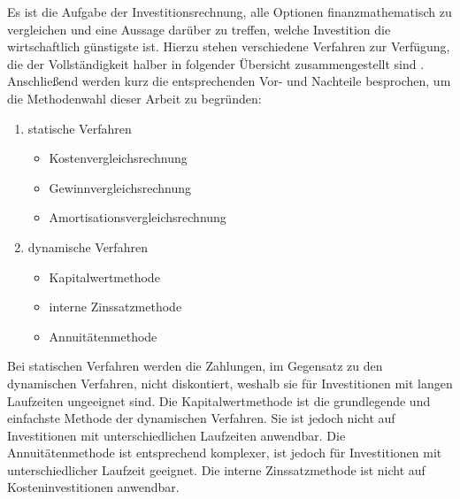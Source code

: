 Es ist die Aufgabe der Investitionsrechnung, alle Optionen finanzmathematisch zu vergleichen und eine Aussage darüber zu treffen, welche Investition die wirtschaftlich günstigste ist. Hierzu stehen verschiedene Verfahren zur Verfügung, die der Vollständigkeit halber in folgender Übersicht zusammengestellt sind \cite{Boesch2013}. Anschließend werden kurz die entsprechenden Vor- und Nachteile besprochen, um die Methodenwahl dieser Arbeit zu begründen:
	\begin{enumerate}
		\item statische Verfahren
			\begin{itemize}
				\item Kostenvergleichsrechnung
				\item Gewinnvergleichsrechnung
				\item Amortisationsvergleichsrechnung
			\end{itemize}
		\item dynamische Verfahren
			\begin{itemize}
				\item Kapitalwertmethode
				\item interne Zinssatzmethode 
				\item Annuitätenmethode
			\end{itemize}
	\end{enumerate}
Bei statischen Verfahren werden die Zahlungen, im Gegensatz zu den dynamischen Verfahren, nicht diskontiert, weshalb sie für Investitionen mit langen Laufzeiten ungeeignet sind. Die Kapitalwertmethode ist die grundlegende und einfachste Methode der dynamischen Verfahren. Sie ist jedoch nicht auf Investitionen mit unterschiedlichen Laufzeiten anwendbar. Die Annuitätenmethode ist entsprechend komplexer, ist jedoch für Investitionen mit unterschiedlicher Laufzeit geeignet. Die interne Zinssatzmethode ist nicht auf Kosteninvestitionen anwendbar. \cite{Boesch2013}
  
